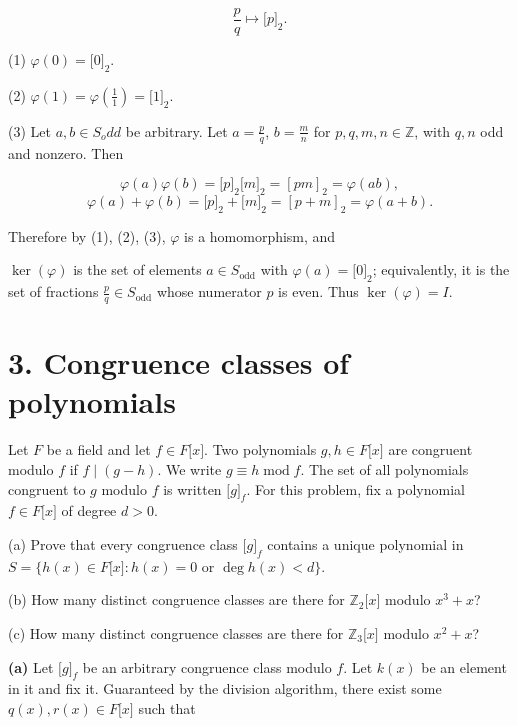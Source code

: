 \[\frac{p}{q}\mapsto\lbrack p\rbrack_{2}.\]

(1) \(\varphi(0) = \lbrack 0\rbrack_{2}\).

(2) \(\varphi(1) = \varphi\left( \frac{1}{1} \right) = \lbrack 1\rbrack_{2}\).

(3) Let \(a,b \in S_{o}dd\) be arbitrary. Let \(a = \frac{p}{q}\), \(b = \frac{m}{n}\) for \(p,q,m,n \in \mathbb{Z}\), with \(q,n\) odd and nonzero. Then

\[\varphi(a)\varphi(b) = \lbrack p\rbrack_{2}\lbrack m\rbrack_{2} = \left\lbrack {pm} \right\rbrack_{2} = \varphi\left( {ab} \right),\]\[\varphi(a) + \varphi(b) = \lbrack p\rbrack_{2} + \lbrack m\rbrack_{2} = \left\lbrack {p + m} \right\rbrack_{2} = \varphi\left( {a + b} \right).\]

Therefore by (1), (2), (3), \(\varphi\) is a homomorphism, and

\(\ker(\varphi)\) is the set of elements \(a \in S_{\text{odd}}\) with \(\varphi(a) = \lbrack 0\rbrack_{2}\); equivalently, it is the set of fractions \(\frac{p}{q} \in S_{\text{odd}}\) whose numerator \(p\) is even. Thus \(\ker(\varphi) = I\).

\section{3. Congruence classes of polynomials}

Let \(F\) be a field and let \(f \in F\lbrack x\rbrack\). Two polynomials \(g,h \in F\lbrack x\rbrack\) are congruent modulo \(f\) if \(f \mid \left( {g - h} \right)\). We write \(g \equiv h\operatorname{mod}f\). The set of all polynomials congruent to \(g\) modulo \(f\) is written \(\lbrack g\rbrack_{f}\). For this problem, fix a polynomial \(f \in F\lbrack x\rbrack\) of degree \(d > 0\).

(a) Prove that every congruence class \(\lbrack g\rbrack_{f}\) contains a unique polynomial in \(S = \{ h(x) \in F\lbrack x\rbrack:h(x) = 0\) or \(\deg h(x) < d\}\).

(b) How many distinct congruence classes are there for \(\mathbb{Z}_{2}\lbrack x\rbrack\) modulo \(x^{3} + x\)?

(c) How many distinct congruence classes are there for \(\mathbb{Z}_{3}\lbrack x\rbrack\) modulo \(x^{2} + x\)?

\textbf{(a)} Let \(\lbrack g\rbrack_{f}\) be an arbitrary congruence class modulo \(f\). Let \(k(x)\) be an element in it and fix it. Guaranteed by the division algorithm, there exist some \(q(x),r(x) \in F\lbrack x\rbrack\) such that

